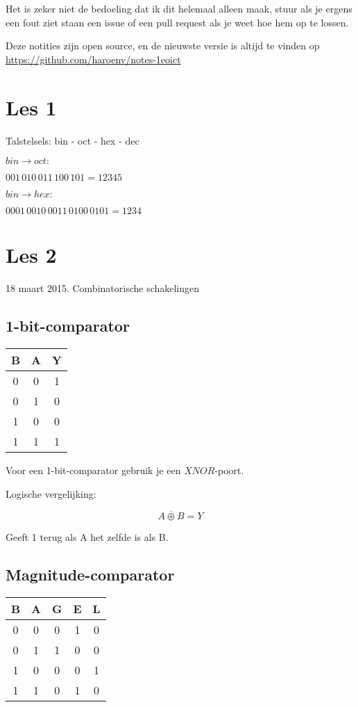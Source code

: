 \documentclass[11pt, a4paper]{article}
\begin{document}
Het is zeker niet de bedoeling dat ik dit helemaal alleen maak, stuur als je ergens een fout ziet staan een issue of een pull request als je weet hoe hem op te lossen.

Deze notities zijn open source, en de nieuwste versie is altijd te vinden op \url{https://github.com/haroenv/notes-1eoict}

\section{Les 1}

Talstelsels: bin - oct - hex - dec

$bin \rightarrow oct:$

$001\, 010\, 011\, 100\, 101 = 12345$

$bin \rightarrow hex:$

$0001\, 0010\, 0011\, 0100\, 0101 = 1234$

\section{Les 2}

18 maart 2015. Combinatorische schakelingen

\subsection{1-bit-comparator}

\begin{tabular}{c c | c}
	B & A & Y \\
	\hline
	0 & 0 & 1 \\
	0 & 1 & 0 \\
	1 & 0 & 0 \\
	1 & 1 & 1 \\
\end{tabular}

Voor een 1-bit-comparator gebruik je een $XNOR$-poort.

Logische vergelijking:

\begin{equation}
	\overline{A \oplus B} = Y %
\end{equation}

Geeft 1 terug als A het zelfde is als B.

\subsection{Magnitude-comparator}

\begin{tabular}{c c | c c c}
	B & A & G & E & L \\
	\hline
	0 & 0 & 0 & 1 & 0 \\
	0 & 1 & 1 & 0 & 0 \\
	1 & 0 & 0 & 0 & 1 \\
	1 & 1 & 0 & 1 & 0 \\
\end{tabular}
\end{document}

